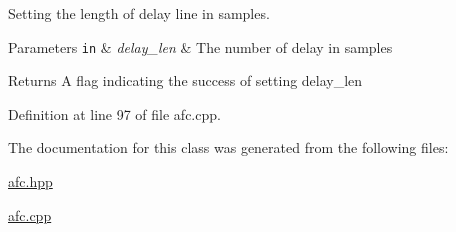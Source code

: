 Setting the length of delay line in samples. 


\begin{DoxyParams}[1]{Parameters}
\mbox{\tt in}  & {\em delay\+\_\+len} & The number of delay in samples \\
\hline
\end{DoxyParams}
\begin{DoxyReturn}{Returns}
A flag indicating the success of setting delay\+\_\+len 
\end{DoxyReturn}


Definition at line 97 of file afc.\+cpp.



The documentation for this class was generated from the following files\+:\begin{DoxyCompactItemize}
\item 
\hyperlink{afc_8hpp}{afc.\+hpp}\item 
\hyperlink{afc_8cpp}{afc.\+cpp}\end{DoxyCompactItemize}
